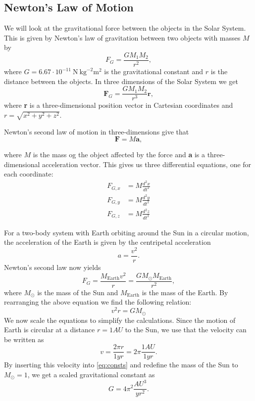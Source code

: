 \documentclass[12pt,a4paper,english]{article}
\begin{document}
\subsection{Newton's Law of Motion}
\label{subsect:Newton}
We will look at the gravitational force between the objects in the Solar System. This is given by Newton's law of gravitation between two objects with masses $M$ by
\begin{equation}
\label{eq:2D_FG}
F_G=\frac{GM_1M_2}{r^2},
\end{equation}
where $G=6.67\cdot10^{-11} \ \textrm{N} \ \textrm{kg}^{-2} \textrm{m}^2$ is the gravitational constant and $r$ is the distance between the objects. In three dimensions of the Solar System we get
\begin{equation}
\label{eq:3D_FG}
\textbf{F}_G=\frac{GM_1M_2}{r^3}\textbf{r},
\end{equation}
where \textbf{r} is a three-dimensional position vector in Cartesian coordinates and $r=\sqrt{x^2+y^2+z^2}$.

Newton's second law of motion in three-dimensions give that 
\begin{equation}
\label{eq:N2L}
\textbf{F}=M\textbf{a},
\end{equation}

where $M$ is the mass og the object affected by the force and \textbf{a} is a three-dimensional acceleration vector. This gives us three differential equations, one for each coordinate:
\begin{align*}
F_{G,x}&=M\frac{d^2x}{dt^2}\\
F_{G,y}&=M\frac{d^2y}{dt^2}\\
F_{G,z}&=M\frac{d^2z}{dt^2}
\end{align*}

For a two-body system with Earth orbiting around the Sun in a circular motion, the acceleration of the Earth is given by the centripetal acceleration \[a=\frac{v^2}{r}.\]
Newton's second law now yields
\begin{equation}
F_G=\frac{M_{\text{Earth}}v^2}{r}=\frac{GM_{\odot}M_{\text{Earth}}}{r^2},
\end{equation}
where $M_{\odot}$ is the mass of the Sun and $M_{\text{Earth}}$ is the mass of the Earth. By rearranging the above equation we find the following relation:
\begin{equation}
\label{eq:consts}
v^2r=GM_{\odot}
\end{equation}
We now scale the equations to simplify the calculations.
Since the motion of Earth is circular at a distance $r=1AU$ to the Sun, we use that the velocity can be written as
\begin{equation}
\label{eq:circ_vel}
v=\frac{2\pi r}{1yr}=2\pi\frac{1AU}{1yr}.
\end{equation}
By inserting this velocity into \ref{eq:consts} and redefine the mass of the Sun to $M_{\odot}=1$, we get a scaled gravitational constant as
\begin{equation}
\label{eq:scaled_G}
G=4\pi^2\frac{AU^3}{yr^2}.
\end{equation}
\end{document}
